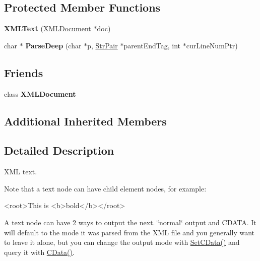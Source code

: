 \subsection*{Protected Member Functions}
\begin{DoxyCompactItemize}
\item 
\mbox{\label{classtinyxml2_1_1_x_m_l_text_ad9f46d70e61e5386ead93728d8b90267}} 
{\bfseries X\+M\+L\+Text} (\mbox{\hyperlink{classtinyxml2_1_1_x_m_l_document}{X\+M\+L\+Document}} $\ast$doc)
\item 
\mbox{\label{classtinyxml2_1_1_x_m_l_text_af3b93344f1183482e1683f5922ac9c68}} 
char $\ast$ {\bfseries Parse\+Deep} (char $\ast$p, \mbox{\hyperlink{classtinyxml2_1_1_str_pair}{Str\+Pair}} $\ast$parent\+End\+Tag, int $\ast$cur\+Line\+Num\+Ptr)
\end{DoxyCompactItemize}
\subsection*{Friends}
\begin{DoxyCompactItemize}
\item 
\mbox{\label{classtinyxml2_1_1_x_m_l_text_a4eee3bda60c60a30e4e8cd4ea91c4c6e}} 
class {\bfseries X\+M\+L\+Document}
\end{DoxyCompactItemize}
\subsection*{Additional Inherited Members}


\subsection{Detailed Description}
X\+ML text.

Note that a text node can have child element nodes, for example\+: \begin{DoxyVerb}<root>This is <b>bold</b></root>
\end{DoxyVerb}


A text node can have 2 ways to output the next. \char`\"{}normal\char`\"{} output and C\+D\+A\+TA. It will default to the mode it was parsed from the X\+ML file and you generally want to leave it alone, but you can change the output mode with \mbox{\hyperlink{classtinyxml2_1_1_x_m_l_text_ad080357d76ab7cc59d7651249949329d}{Set\+C\+Data()}} and query it with \mbox{\hyperlink{classtinyxml2_1_1_x_m_l_text_ac1bb5ea4166c320882d9e0ad16fd385b}{C\+Data()}}. 

